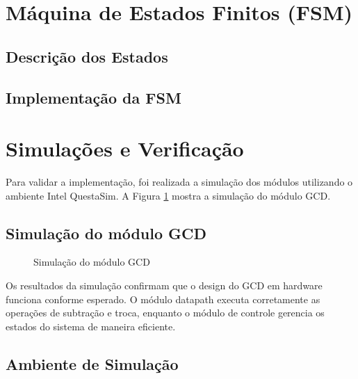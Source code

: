 \documentclass[a4paper,11pt]{article} %
\begin{document}
\section{Máquina de Estados Finitos (FSM)}

\subsection{Descrição dos Estados}

\subsection{Implementação da FSM}

\section{Simulações e Verificação}

Para validar a implementação, foi realizada a simulação dos módulos utilizando o ambiente Intel QuestaSim. A Figura \ref{fig:simulacao} mostra a simulação do módulo GCD.

\subsection{Simulação do módulo GCD}
\begin{figure}[ht]
    \centering
    \caption{Simulação do módulo GCD}
    \label{fig:simulacao}
\end{figure}

Os resultados da simulação confirmam que o design do GCD em hardware funciona conforme esperado. O módulo datapath executa corretamente as operações de subtração e troca, enquanto o módulo de controle gerencia os estados do sistema de maneira eficiente.

\subsection{Ambiente de Simulação}
\end{document}

